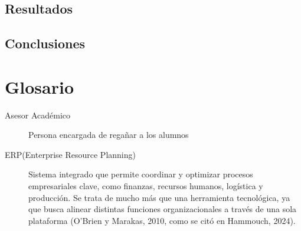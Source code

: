 \documentclass[12pt,letterpaper,spanish]{report}
\begin{document}
\section{Resultados}


\section{Conclusiones}



\newpage

\appendix

\nocite{book}
\nocite{dura2022saas}
\nocite{pretell2024mejora}
\nocite{odooDocs}
\nocite{book}


%
%








\newpage
\chapter{Glosario}

\begin{description}
  \item[Asesor Académico] Persona encargada de regañar a los alumnos
\end{description}

\begin{description}
  \item[ERP(Enterprise Resource Planning)]  Sistema integrado que permite coordinar y 
  optimizar procesos empresariales clave, como finanzas, recursos humanos, logística y producción. 
  Se trata de mucho más que una herramienta tecnológica, ya que busca alinear distintas funciones organizacionales a través de una sola plataforma 
  (O'Brien y Marakas, 2010, como se citó en Hammouch, 2024). %
\end{description}
\end{document}
